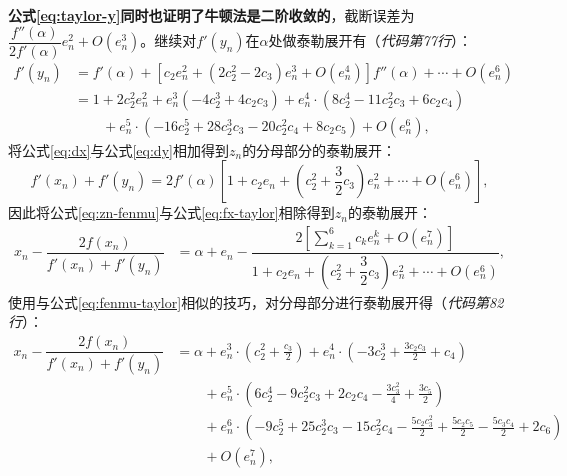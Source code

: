 \textbf{公式\ref{eq:taylor-y}同时也证明了牛顿法是二阶收敛的}，截断误差为$\dfrac{f''(\alpha)}{2f'(\alpha)}e_n^2 + O(e_n^3)$。继续对$f'(y_n)$在$\alpha$处做泰勒展开有（\textit{代码第77行}）：
\begin{equation}
    \label{eq:dy}
    \begin{aligned}
        f'(y_n) &= f'(\alpha) + [c_2e_n^2 + (2c_2^2 - 2c_3)e_n^3 + O(e_n^4)]f''(\alpha) + \cdots + O(e_n^6) \\
        &= 1 + 2 c_{2}^{2} e_n^{2} + e_n^{3} \left(- 4 c_{2}^{3} + 4 c_{2} c_{3}\right) + e_n^{4} \cdot \left(8 c_{2}^{4} - 11 c_{2}^{2} c_{3} + 6 c_{2} c_{4}\right) \\
        &\qquad + e_n^{5} \cdot \left(- 16 c_{2}^{5} + 28 c_{2}^{3} c_{3} - 20 c_{2}^{2} c_{4} + 8 c_{2} c_{5}\right) + O\left(e_n^{6}\right),
    \end{aligned}
\end{equation}
将公式\ref{eq:dx}与公式\ref{eq:dy}相加得到$z_n$的分母部分的泰勒展开：
\begin{equation}
    \label{eq:zn-fenmu}
    f'(x_n) + f'(y_n) = 2f'(\alpha)\left[ 1 + c_2e_n + \left( c_2^2 + \dfrac{3}{2}c_3 \right)e_n^2 + \cdots + O(e_n^6) \right],
\end{equation}
因此将公式\ref{eq:zn-fenmu}与公式\ref{eq:fx-taylor}相除得到$z_n$的泰勒展开：
\begin{equation}
    \begin{aligned}
        x_n - \dfrac{2f(x_n)}{f'(x_n) + f'(y_n)} &= \alpha + e_n - \dfrac{2\left[ \sum\limits_{k=1}^6 c_ke_n^k + O(e_n^7) \right]}{1 + c_2e_n+ \left(c_2^2 + \dfrac{3}{2}c_3  \right)e_n^2 + \cdots + O(e_n^6)},
    \end{aligned}
\end{equation}
使用与公式\ref{eq:fenmu-taylor}相似的技巧，对分母部分进行泰勒展开得（\textit{代码第82行}）：
\begin{equation}
    \label{eq:taylor-z}
    \begin{aligned}
        x_n - \dfrac{2f(x_n)}{f'(x_n) + f'(y_n)} &= \alpha + e_n^{3} \cdot \left(c_{2}^{2} + \frac{c_{3}}{2}\right) + e_n^{4} \cdot \left(- 3 c_{2}^{3} + \frac{3 c_{2} c_{3}}{2} + c_{4}\right) \\
        &\qquad + e_n^{5} \cdot \left(6 c_{2}^{4} - 9 c_{2}^{2} c_{3} + 2 c_{2} c_{4} - \frac{3 c_{3}^{2}}{4} + \frac{3 c_{5}}{2}\right) \\
        &\qquad + e_n^{6} \cdot \left(- 9 c_{2}^{5} + 25 c_{2}^{3} c_{3} - 15 c_{2}^{2} c_{4} - \frac{5 c_{2} c_{3}^{2}}{2} + \frac{5 c_{2} c_{5}}{2} - \frac{5 c_{3} c_{4}}{2} + 2 c_{6}\right) \\
        &\qquad + O\left(e_n^{7}\right),
    \end{aligned}
\end{equation}
